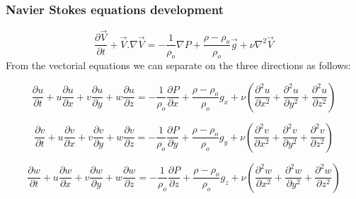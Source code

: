 \documentclass[xcolor=dvipsnames,10pt,aspectratio=169]{beamer}
\begin{document}
\begin{frame}
	\frametitle{Navier Stokes equations development}
	\centering
	\begin{equation}
		\frac{\partial \vec{V}}{\partial t} +  \vec{V} . {\nabla} \vec{V}  =  -\frac{1}{\rho_o} {\nabla}P + \frac{\rho - \rho_o}{\rho_o} \vec{g} + \nu \nabla ^2 \vec{V}
	\end{equation}
	From the vectorial equations we can separate on the three directions as follows:

	\begin{equation}
		\frac{\partial u}{\partial t} + u\frac{\partial u}{\partial x} + v\frac{\partial u}{\partial y} + w\frac{\partial u }{\partial z}  =  -\frac{1}{\rho_o} \frac{\partial P}{\partial x} + \frac{\rho - \rho_o}{\rho_o} g_x + \nu \left( \frac{\partial ^2 u}{\partial x^2} + \frac{\partial ^2 u}{\partial y^2} + \frac{\partial ^2 u}{\partial z^2} \right)
	\end{equation}

	\begin{equation}
		\frac{\partial v}{\partial t} + u\frac{\partial v}{\partial x} + v\frac{\partial v}{\partial y} + w\frac{\partial v }{\partial z}  =  -\frac{1}{\rho_o} \frac{\partial P}{\partial y} + \frac{\rho - \rho_o}{\rho_o} g_y + \nu \left( \frac{\partial ^2 v}{\partial x^2} + \frac{\partial ^2 v}{\partial y^2} + \frac{\partial ^2 v}{\partial z^2} \right)
	\end{equation}

	\begin{equation}
		\frac{\partial w}{\partial t} + u\frac{\partial w}{\partial x} + v\frac{\partial w}{\partial y} + w\frac{\partial w }{\partial z}  =  -\frac{1}{\rho_o} \frac{\partial P}{\partial z} + \frac{\rho - \rho_o}{\rho_o} g_z + \nu \left( \frac{\partial ^2 w}{\partial x^2} + \frac{\partial ^2 w}{\partial y^2} + \frac{\partial ^2 w}{\partial z^2} \right)
	\end{equation}
\end{frame}
\end{document}
